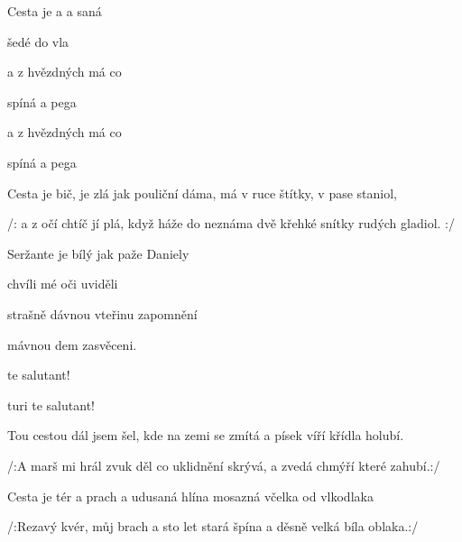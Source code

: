 

\zs
Cesta je  a  a saná 

 šedé   do vla

a z hvězdných  má  co 

 spíná a    pega

a z hvězdných  má  co 

 spíná a    pega
\ks

\zs
Cesta je bič, je zlá jak pouliční dáma,
má v ruce štítky, v pase staniol,

/: a z očí chtíč jí plá, když háže do neznáma
dvě křehké snítky rudých gladiol. :/
\ks

\zr
Seržante  je bílý jak paže Daniely

 chvíli mé oči uviděli

 strašně dávnou vteřinu zapomnění

 mávnou dem zasvěceni.

 te salutant!

turi te salutant!
\kr

\zr
Tou cestou dál jsem šel, kde na zemi se zmítá
a písek víří křídla holubí.

/:A marš mi hrál zvuk děl
co uklidnění skrývá, a zvedá chmýří které zahubí.:/
\kr

\zr
Cesta je tér a prach a udusaná hlína
mosazná včelka od vlkodlaka

/:Rezavý kvér, můj brach a sto let stará špína
a děsně velká bíla oblaka.:/
\kr

\zr   \kr

\kp







